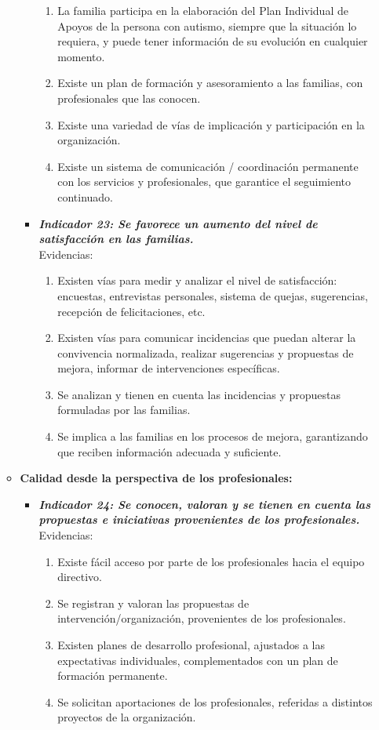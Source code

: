 \begin{itemize}
\begin{itemize}
\begin{itemize}
			\begin{enumerate}
				\item La familia participa en la elaboración del Plan Individual de Apoyos de la persona con autismo, siempre que la situación lo requiera, y puede tener información de su evolución en cualquier momento.
				\item Existe un plan de formación y asesoramiento a las familias, con profesionales que las conocen. 
				\item Existe una variedad de vías de implicación y participación en la organización. 
				\item Existe un sistema de comunicación / coordinación permanente con los servicios y profesionales, que garantice el seguimiento continuado.      
				 
			\end{enumerate}
			\item \textbf{\textit{Indicador 23: Se favorece un aumento del nivel de satisfacción en las familias.}}\\Evidencias:
			
			\begin{enumerate}
				\item Existen vías para medir y analizar el nivel de satisfacción: encuestas, entrevistas personales, sistema de quejas, sugerencias, recepción de felicitaciones, etc. 
				\item Existen vías para comunicar incidencias que puedan alterar la convivencia normalizada, realizar sugerencias y propuestas de mejora, informar de intervenciones específicas. 
				\item Se analizan y tienen en cuenta las incidencias y propuestas formuladas por las familias. 
				\item Se implica a las familias en los procesos de mejora, garantizando que reciben información adecuada y suficiente.      
				
			\end{enumerate}
		\end{itemize}
		\item \textbf{Calidad desde la perspectiva de los profesionales:}
		\begin{itemize}
			\item \textbf{\textit{Indicador 24: Se conocen, valoran y se tienen en cuenta las propuestas e iniciativas provenientes de los profesionales.}}\\Evidencias:
			
			\begin{enumerate}
				\item Existe fácil acceso por parte de los profesionales hacia el equipo directivo. 
				\item Se registran y valoran las propuestas de intervención/organización, provenientes de los profesionales. 
				\item Existen planes de desarrollo profesional, ajustados a las expectativas individuales, complementados con un plan de formación permanente. 
				\item Se solicitan aportaciones de los profesionales, referidas a distintos proyectos de la organización.        
				 

\end{enumerate}
\end{itemize}
\end{itemize}
\end{itemize}
